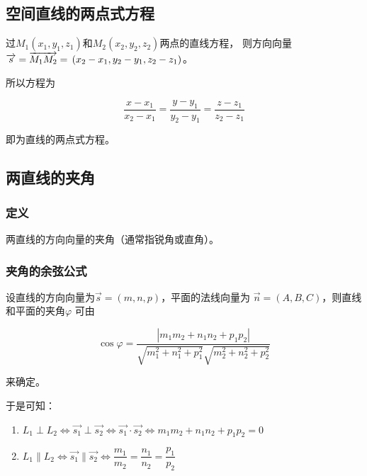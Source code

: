 \documentclass[
	11pt, %
	a4paper, %
]{WhuSakuraBook}
\begin{document}
\subsection{空间直线的两点式方程}

    过\(M_1\left(x_1, y_1, z_1\right)\)和\(M_2\left(x_2, y_2, z_2\right)\)两点的直线方程，
    则方向向量\(\overrightarrow{s} = \overrightarrow{M_{1}M_{2}} = \\
    \left(x_2-x_1, y_2-y_1, z_2-z_1\right)\)。

    所以方程为

    \begin{equation}
        \frac{x-x_1}{x_2-x_1}=\frac{y-y_1}{y_2-y_1}=\frac{z-z_1}{z_2-z_1}
    \end{equation}

    即为直线的两点式方程。

\subsection{两直线的夹角}

\subsubsection{定义}

    两直线的方向向量的夹角（通常指锐角或直角）。

\subsubsection{夹角的余弦公式}

    设直线的方向向量为\(\overrightarrow{s} = \left(m, n, p\right)\)，平面的法线向量为
    \(\overrightarrow{n} = \left(A, B, C\right)\)，则直线和平面的夹角\(\varphi\)
    可由

    \begin{equation}
        \cos \varphi=\frac{\left|m_1 m_2+n_1 n_2+p_1 p_2\right|}{\sqrt{m_1^2+n_1^2+p_1^2} \sqrt{m_2^2+n_2^2+p_2^2}}
    \end{equation}

    来确定。

    于是可知：

    \begin{enumerate}
        \item \(L_1 \perp L_2 \Leftrightarrow \overrightarrow{s_1} \perp \overrightarrow{s_2}
            \Leftrightarrow \overrightarrow{s_1} \cdot \overrightarrow{s_2} \Leftrightarrow
            m_1 m_2+n_1 n_2+p_1 p_2 = 0\)
        \item \(L_1 \parallel L_2 \Leftrightarrow \overrightarrow{s_1} \parallel \overrightarrow{s_2}
        \Leftrightarrow \dfrac{m_1}{m_2}=\dfrac{n_1}{n_2}=\dfrac{p_1}{p_2}\)
    \end{enumerate}
\end{document}
